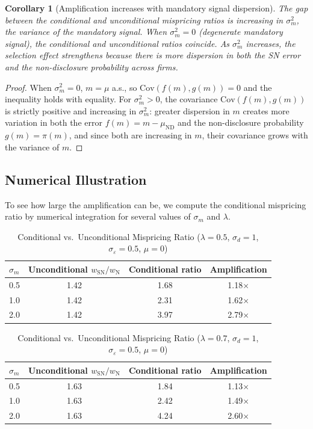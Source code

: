 \documentclass[12pt]{article}
\theoremstyle{plain}
\newtheorem{corollary}[proposition]{Corollary}
\theoremstyle{definition}
\newcommand{\Cov}{\mathrm{Cov}}
\newcommand{\ND}{\mathrm{ND}}
\newcommand{\SN}{\mathrm{SN}}
\newcommand{\N}{\mathrm{N}}
\begin{document}
\begin{corollary}[Amplification increases with mandatory signal dispersion]
\label{cor:sigma_m}
The gap between the conditional and unconditional mispricing ratios is increasing in $\sigma_m^2$, the variance of the mandatory signal. When $\sigma_m^2 = 0$ (degenerate mandatory signal), the conditional and unconditional ratios coincide. As $\sigma_m^2$ increases, the selection effect strengthens because there is more dispersion in both the SN error and the non-disclosure probability across firms.
\end{corollary}

\begin{proof}
When $\sigma_m^2 = 0$, $m = \mu$ a.s., so $\Cov(f(m), g(m)) = 0$ and the inequality holds with equality. For $\sigma_m^2 > 0$, the covariance $\Cov(f(m), g(m))$ is strictly positive and increasing in $\sigma_m^2$: greater dispersion in $m$ creates more variation in both the error $f(m) = m - \mu_\ND$ and the non-disclosure probability $g(m) = \pi(m)$, and since both are increasing in $m$, their covariance grows with the variance of $m$.
\end{proof}

\subsection{Numerical Illustration}

To see how large the amplification can be, we compute the conditional mispricing ratio by numerical integration for several values of $\sigma_m$ and $\lambda$.

\begin{table}[h!]
\centering
\caption{Conditional vs.\ Unconditional Mispricing Ratio ($\lambda = 0.5$, $\sigma_d = 1$, $\sigma_\varepsilon = 0.5$, $\mu = 0$)}
\label{tab:conditional_05}
\begin{tabular}{lccc}
\toprule
$\sigma_m$ & Unconditional $w_\SN/w_\N$ & Conditional ratio & Amplification \\
\midrule
0.5 & 1.42 & 1.68 & 1.18$\times$ \\
1.0 & 1.42 & 2.31 & 1.62$\times$ \\
2.0 & 1.42 & 3.97 & 2.79$\times$ \\
\bottomrule
\end{tabular}
\end{table}

\begin{table}[h!]
\centering
\caption{Conditional vs.\ Unconditional Mispricing Ratio ($\lambda = 0.7$, $\sigma_d = 1$, $\sigma_\varepsilon = 0.5$, $\mu = 0$)}
\label{tab:conditional_07}
\begin{tabular}{lccc}
\toprule
$\sigma_m$ & Unconditional $w_\SN/w_\N$ & Conditional ratio & Amplification \\
\midrule
0.5 & 1.63 & 1.84 & 1.13$\times$ \\
1.0 & 1.63 & 2.42 & 1.49$\times$ \\
2.0 & 1.63 & 4.24 & 2.60$\times$ \\
\bottomrule
\end{tabular}
\end{table}
\end{document}
